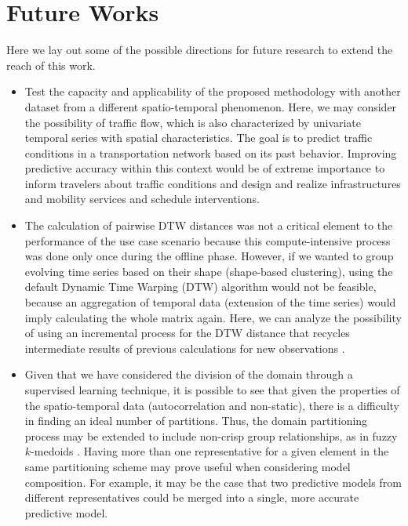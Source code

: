 \section{Future Works}

Here we lay out some of the possible directions for future research to extend the reach of this work.

\begin{itemize}
    
    \item Test the capacity and applicability of the proposed methodology with another dataset from a different spatio-temporal phenomenon. Here, we may consider the possibility of traffic flow, which is also characterized by univariate temporal series with spatial characteristics. The goal is to predict traffic conditions in a transportation network based on its past behavior. Improving predictive accuracy within this context would be of extreme importance to inform travelers about traffic conditions and design and realize infrastructures and mobility services and schedule interventions.
    
    \item The calculation of pairwise DTW distances was not a critical element to the performance of the use case scenario because this compute-intensive process was done only once during the offline phase. However, if we wanted to group evolving time series based on their shape (shape-based clustering), using the default Dynamic Time Warping (DTW) algorithm would not be feasible, because an aggregation of temporal data (extension of the time series) would imply calculating the whole matrix again. Here, we can analyze the possibility of using an incremental process for the DTW distance that recycles intermediate results of previous calculations for new observations \cite{Oregi2017}.
    
    \item Given that we have considered the division of the domain through a supervised learning technique, it is possible to see that given the properties of the spatio-temporal data (autocorrelation and non-static), there is a difficulty in finding an ideal number of partitions. Thus, the domain partitioning process may be extended to include non-crisp group relationships, as in fuzzy $k$-medoids \cite{Izakian2015}. Having more than one representative for a given element in the same partitioning scheme may prove useful when considering model composition. For example, it may be the case that two predictive models from different representatives could be merged into a single, more accurate predictive model.


\end{itemize}
